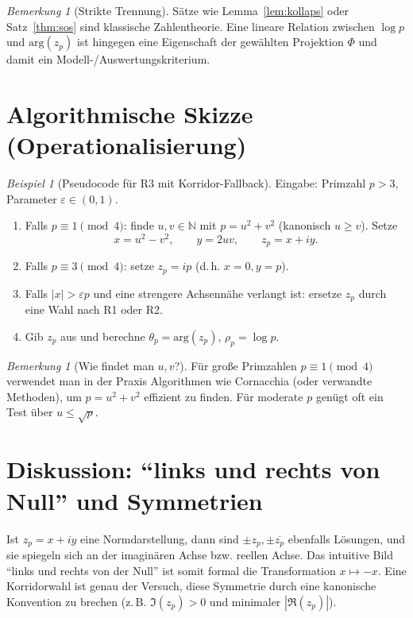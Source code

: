 \documentclass[a4paper,11pt]{article}
\theoremstyle{definition}
\theoremstyle{remark}
\newtheorem{bemerkung}[satz]{Bemerkung}
\newtheorem{beispiel}[satz]{Beispiel}
\newcommand{\N}{\mathbb{N}}
\newcommand{\Arg}{\mathrm{arg}}
\begin{document}
	\begin{bemerkung}[Strikte Trennung]
		Sätze wie Lemma~\ref{lem:kollaps} oder Satz~\ref{thm:sos} sind klassische Zahlentheorie.
		Eine lineare Relation zwischen \(\log p\) und \(\Arg(z_p)\) ist hingegen eine Eigenschaft der gewählten Projektion \(\Phi\)
		und damit ein Modell-/Auswertungskriterium.
	\end{bemerkung}
	
	\section{Algorithmische Skizze (Operationalisierung)}
	\begin{beispiel}[Pseudocode für R3 mit Korridor-Fallback]
		\label{ex:pseudo}
		Eingabe: Primzahl \(p>3\), Parameter \(\varepsilon\in(0,1)\).
		
		\begin{enumerate}
			\item Falls \(p\equiv 1\pmod4\): finde \(u,v\in\N\) mit \(p=u^2+v^2\) (kanonisch \(u\ge v\)). Setze
			\[
			x=u^2-v^2,\qquad y=2uv,\qquad z_p=x+iy.
			\]
			\item Falls \(p\equiv 3\pmod4\): setze \(z_p=ip\) (d.\,h. \(x=0,y=p\)).
			\item Falls \(|x|>\varepsilon p\) und eine strengere Achsennähe verlangt ist: ersetze \(z_p\) durch eine Wahl nach R1 oder R2.
			\item Gib \(z_p\) aus und berechne \(\theta_p=\Arg(z_p)\), \(\rho_p=\log p\).
		\end{enumerate}
	\end{beispiel}
	
	\begin{bemerkung}[Wie findet man \(u,v\)?]
		Für große Primzahlen \(p\equiv 1\pmod4\) verwendet man in der Praxis Algorithmen wie Cornacchia (oder verwandte Methoden),
		um \(p=u^2+v^2\) effizient zu finden. Für moderate \(p\) genügt oft ein Test über \(u\le\sqrt{p}\).
	\end{bemerkung}
	
	\section{Diskussion: ``links und rechts von Null'' und Symmetrien}
	Ist \(z_p=x+iy\) eine Normdarstellung, dann sind \(\pm z_p,\pm \overline{z_p}\) ebenfalls Lösungen, und sie spiegeln
	sich an der imaginären Achse bzw. reellen Achse. Das intuitive Bild ``links und rechts von der Null'' ist somit
	formal die Transformation \(x\mapsto -x\). Eine Korridorwahl ist genau der Versuch, diese Symmetrie durch eine
	kanonische Konvention zu brechen (z.\,B. \(\Im(z_p)>0\) und minimaler \(|\Re(z_p)|\)).
	
\end{document}
